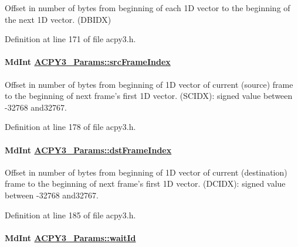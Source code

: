 Offset in number of bytes from beginning of each 1D vector to the beginning of the next 1D vector. (DBIDX) 

Definition at line 171 of file acpy3.h.\hypertarget{struct_a_c_p_y3___params_a55f98d127d647472af9751ca1d780aa}{
\paragraph[srcFrameIndex]{\setlength{\rightskip}{0pt plus 5cm}Md\-Int \hyperlink{struct_a_c_p_y3___params_a55f98d127d647472af9751ca1d780aa}{ACPY3\_\-Params::src\-Frame\-Index}}\hfill}
\label{struct_a_c_p_y3___params_a55f98d127d647472af9751ca1d780aa}


Offset in number of bytes from beginning of 1D vector of current (source) frame to the beginning of next frame's first 1D vector. (SCIDX): signed value between -32768 and32767. 

Definition at line 178 of file acpy3.h.\hypertarget{struct_a_c_p_y3___params_4cb42bfade573225a65fc3f6d75c0b68}{
\paragraph[dstFrameIndex]{\setlength{\rightskip}{0pt plus 5cm}Md\-Int \hyperlink{struct_a_c_p_y3___params_4cb42bfade573225a65fc3f6d75c0b68}{ACPY3\_\-Params::dst\-Frame\-Index}}\hfill}
\label{struct_a_c_p_y3___params_4cb42bfade573225a65fc3f6d75c0b68}


Offset in number of bytes from beginning of 1D vector of current (destination) frame to the beginning of next frame's first 1D vector. (DCIDX): signed value between -32768 and32767. 

Definition at line 185 of file acpy3.h.\hypertarget{struct_a_c_p_y3___params_c04bb0a91f1c3f8e8a833fe7e28f7770}{
\paragraph[waitId]{\setlength{\rightskip}{0pt plus 5cm}Md\-Int \hyperlink{struct_a_c_p_y3___params_c04bb0a91f1c3f8e8a833fe7e28f7770}{ACPY3\_\-Params::wait\-Id}}\hfill}
\label{struct_a_c_p_y3___params_c04bb0a91f1c3f8e8a833fe7e28f7770}


